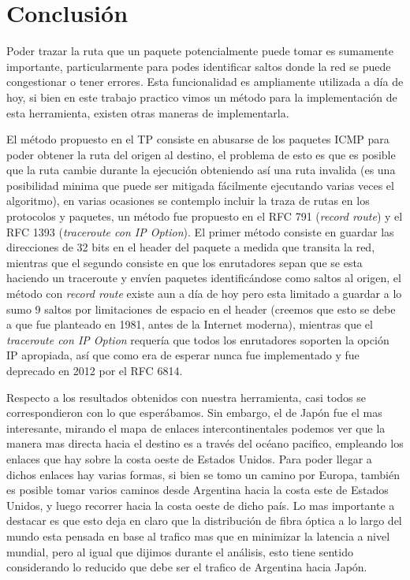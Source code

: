 \section{Conclusión}

Poder trazar la ruta que un paquete potencialmente puede tomar es sumamente importante, particularmente para podes identificar saltos donde la red se puede congestionar o tener errores. Esta funcionalidad es ampliamente utilizada a día de hoy, si bien en este trabajo practico vimos un método para la implementación de esta herramienta, existen otras maneras de implementarla.

El método propuesto en el TP consiste en abusarse de los paquetes ICMP para poder obtener la ruta del origen al destino, el problema de esto es que es posible que la ruta cambie durante la ejecución obteniendo así una ruta invalida (es una posibilidad minima que puede ser mitigada fácilmente ejecutando varias veces el algoritmo), en varias ocasiones se contemplo incluir la traza de rutas en los protocolos y paquetes, un método fue propuesto en el RFC 791 (\textit{record route}) y el RFC 1393 (\textit{traceroute con IP Option}). El primer método consiste en guardar las direcciones de 32 bits en el header del paquete a medida que transita la red, mientras que el segundo consiste en que los enrutadores sepan que se esta haciendo un traceroute y envíen paquetes identificándose como saltos al origen, el método con \textit{record route} existe aun a día de hoy pero esta limitado a guardar a lo sumo 9 saltos por limitaciones de espacio en el header (creemos que esto se debe a que fue planteado en 1981, antes de la Internet moderna), mientras que el \textit{traceroute con IP Option} requería que todos los enrutadores soporten la opción IP apropiada, así que como era de esperar nunca fue implementado y fue deprecado en 2012 por el RFC 6814.


Respecto a los resultados obtenidos con nuestra herramienta, casi todos se correspondieron con lo que esperábamos. Sin embargo, el de Japón fue el mas interesante, mirando el mapa de enlaces intercontinentales podemos ver que la manera mas directa hacia el destino es a través del océano pacifico, empleando los enlaces que hay sobre la costa oeste de Estados Unidos. Para poder llegar a dichos enlaces hay varias formas, si bien se tomo un camino por Europa, también es posible tomar varios caminos desde Argentina hacia la costa este de Estados Unidos, y luego recorrer hacia la costa oeste de dicho país. Lo mas importante a destacar es que esto deja en claro que la distribución de fibra óptica a lo largo del mundo esta pensada en base al trafico mas que en minimizar la latencia a nivel mundial, pero al igual que dijimos durante el análisis, esto tiene sentido considerando lo reducido que debe ser el trafico de Argentina hacia Japón.

